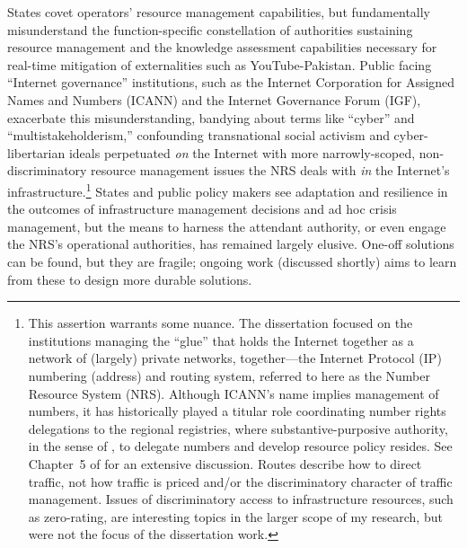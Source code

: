 \documentclass[12pt,journal,compsoc,letterpaper,onecolumn,twoside]{IEEEtran}
\begin{document}
States covet operators' resource management capabilities, but
fundamentally misunderstand the function-specific constellation of
authorities sustaining resource management and 
the knowledge assessment capabilities necessary for real-time
mitigation of externalities such as YouTube-Pakistan.
%
Public facing ``Internet
governance'' institutions, such as the Internet Corporation for
Assigned Names and Numbers (ICANN) and the Internet Governance Forum
(IGF), exacerbate this misunderstanding,
bandying about 
terms like ``cyber'' and ``multistakeholderism,'' confounding
transnational social activism and cyber-libertarian ideals perpetuated
\emph{on} 
the Internet with more narrowly-scoped, non-discriminatory
resource management issues the NRS deals with \emph{in} the Internet's
infrastructure.\footnote{This assertion warrants some nuance.  The
  dissertation focused on the institutions managing the ``glue'' that
  holds the Internet together as a network of (largely) private
  networks, together---the Internet Protocol (IP) numbering (address)
  and routing 
  system, referred to here as the Number Resource System (NRS).
  Although ICANN's name implies management of numbers, it has
  historically played a titular role coordinating number rights
  delegations to the regional registries, where substantive-purposive
  authority, in the sense of , to
  delegate numbers and develop 
  resource policy resides.  See Chapter~5 of 
  for an extensive discussion. 
  Routes describe 
  how to direct 
  traffic, not how traffic is priced and/or the discriminatory character
  of traffic management.  Issues of discriminatory access to infrastructure
  resources, such as zero-rating, are interesting topics in the larger scope
  of my research, but were not the focus of the dissertation work.} 
%
States and public policy makers see adaptation and 
resilience in the outcomes of infrastructure management decisions and
ad hoc crisis management, but
the means to harness the 
attendant authority, or even engage the NRS's operational authorities, has remained largely elusive. 
%
One-off solutions can be found, but they are fragile; ongoing work
(discussed shortly)
aims to learn from these to design more durable solutions.
\end{document}
